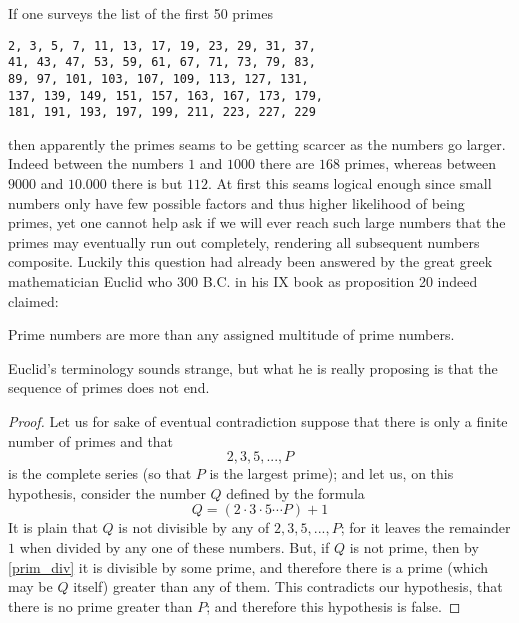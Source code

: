 If one surveys the list of the first 50 primes
\begin{lstlisting}
2, 3, 5, 7, 11, 13, 17, 19, 23, 29, 31, 37,
41, 43, 47, 53, 59, 61, 67, 71, 73, 79, 83,
89, 97, 101, 103, 107, 109, 113, 127, 131,
137, 139, 149, 151, 157, 163, 167, 173, 179,
181, 191, 193, 197, 199, 211, 223, 227, 229
\end{lstlisting}
then apparently the primes seams to be getting scarcer as the numbers go larger. Indeed between the numbers $1$ and $1000$ there are $168$ primes, whereas between $9000$ and $10.000$ there is but $112$. At first this seams logical enough since small numbers only have few possible factors and thus higher likelihood of being primes, yet one cannot help ask if we will ever reach such large numbers that the primes may eventually run out completely, rendering all subsequent numbers composite. Luckily this question had already been answered by the great greek mathematician Euclid who 300 B.C. in his IX book as proposition 20 indeed claimed:

\begin{proposition}
Prime numbers are more than any assigned multitude of prime numbers.
\end{proposition}
Euclid's terminology sounds strange, but what he is really proposing is that the sequence of primes does not end.
\begin{proof}
Let us for sake of eventual contradiction suppose that there is only a finite number of primes and that
\[
2, 3, 5, ..., P
\]
is the complete series (so that $P$ is the largest prime); and let us, on this hypothesis, consider the number $Q$ defined by the formula
\[
Q = (2 \cdot 3 \cdot 5 \cdots P) + 1
\]
It is plain that $Q$ is not divisible by any of $2, 3, 5, ..., P$; for it leaves the remainder $1$ when divided by any one of these numbers. But, if $Q$ is not prime, then by \ref{prim_div} it is divisible by some prime, and therefore there is a prime (which may be $Q$ itself) greater than any of them. This contradicts our hypothesis, that there is no prime greater than $P$; and therefore this hypothesis is false.
\end{proof}

